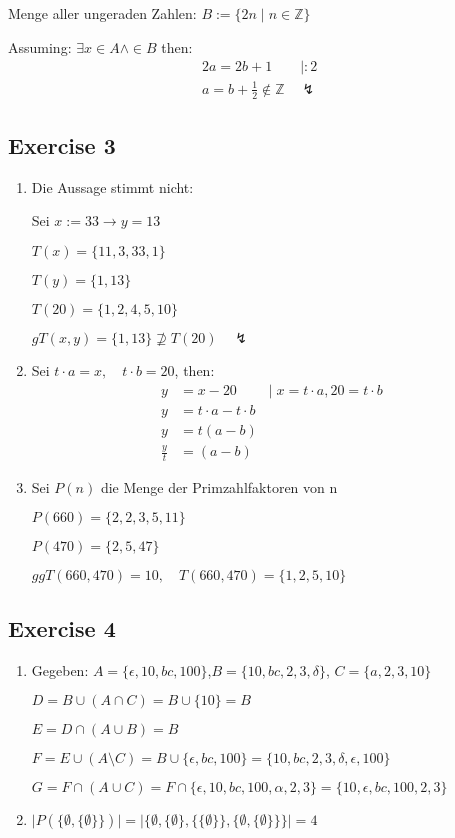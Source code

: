 \documentclass[10pt,a4paper,oneside]{report}
\begin{document}
Menge aller ungeraden Zahlen: $B:=\lbrace 2n\mid n\in\mathbb{Z}\rbrace$

Assuming: $\exists x\in A \wedge\in B$ then:
\begin{equation*}
\begin{split}
	2a = 2b+1\qquad\mid :2 \\
	a = b+\frac{1}{2}\not\in\mathbb{Z}\quad\lightning
\end{split}
\end{equation*}

\subsection{Exercise 3}
\begin{enumerate}
\item Die Aussage stimmt nicht:

Sei $x:=33\rightarrow y=13$

$T(x) = \lbrace 11,3,33,1\rbrace$

$T(y) = \lbrace 1,13\rbrace$

$T(20) = \lbrace 1,2,4,5,10\rbrace$

$gT(x,y) = \lbrace 1,13\rbrace \nsupseteq T(20)\quad\lightning$

\item Sei $t\cdot a =x,\quad t\cdot b=20$, then:
\begin{align*}
y&=x-20 \qquad\mid x=t\cdot a,20=t\cdot b	\\
y&=t\cdot a-t\cdot b							\\
y&=t(a-b)									\\
\frac{y}{t}&=(a-b)\qquad
\end{align*}

\item Sei $P(n)$ die Menge der Primzahlfaktoren von n

$P(660)=\lbrace 2,2,3,5,11\rbrace$

$P(470)=\lbrace 2,5,47\rbrace$

$ggT(660,470) = 10,\quad T(660,470)=\lbrace 1,2,5,10\rbrace$
\end{enumerate}

\subsection{Exercise 4}
\begin{enumerate}
	\item Gegeben: $A=\lbrace\epsilon,10,bc,100\rbrace$,$B=\lbrace 10,bc,2,3,\delta\rbrace$, $C=\lbrace a,2,3,10\rbrace$
	
	$D=B\cup(A\cap C)=B\cup\lbrace 10\rbrace=B$
	
	$E=D\cap(A\cup B) = B$
	
	$F=E\cup(A\setminus C)=B\cup\lbrace \epsilon,bc,100\rbrace = \lbrace 10,bc,2,3,\delta,\epsilon,100 \rbrace$
	
	$G=F\cap(A\cup C) = F\cap\lbrace \epsilon,10,bc,100,\alpha,2,3\rbrace = \lbrace 10,\epsilon,bc,100,2,3\rbrace$
	\item $\mid P(\lbrace\emptyset,\lbrace\emptyset\rbrace\rbrace)\mid = \mid\lbrace\emptyset ,\lbrace\emptyset\rbrace ,\lbrace\lbrace\emptyset\rbrace\rbrace ,\lbrace\emptyset ,\lbrace\emptyset\rbrace\rbrace\rbrace\mid = 4$
\end{enumerate}
\end{document}
